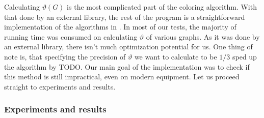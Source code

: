 
Calculating $\vartheta(G)$ is the most complicated part of the coloring algorithm. With that done by an external library, the rest of the program is a straightforward implementation of the algorithms in . In most of our tests, the majority of running time was consumed on calculating $\vartheta$ of various graphs. As it was done by an external library, there isn't much optimization potential for us. One thing of note is, that specifying the precision of $\vartheta$ we want to calculate to be $1/3$ sped up the algorithm by TODO. Our main goal of the implementation was to check if this method is still impractical, even on modern equipment. Let us proceed straight to experiments and results.

\subsubsection{Experiments and results}

